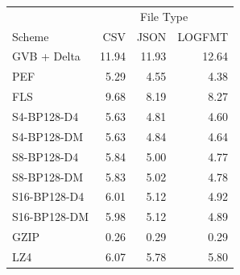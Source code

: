 \begin{tabular}{lrrr}
\toprule
 & \multicolumn{3}{c}{File Type} \\
Scheme & CSV & JSON & LOGFMT \\
\midrule
GVB + Delta & 11.94 & 11.93 & 12.64 \\
PEF & 5.29 & 4.55 & 4.38 \\
FLS & 9.68 & 8.19 & 8.27 \\
S4-BP128-D4 & 5.63 & 4.81 & 4.60 \\
S4-BP128-DM & 5.63 & 4.84 & 4.64 \\
S8-BP128-D4 & 5.84 & 5.00 & 4.77 \\
S8-BP128-DM & 5.83 & 5.02 & 4.78 \\
S16-BP128-D4 & 6.01 & 5.12 & 4.92 \\
S16-BP128-DM & 5.98 & 5.12 & 4.89 \\
GZIP & 0.26 & 0.29 & 0.29 \\
LZ4 & 6.07 & 5.78 & 5.80 \\
\bottomrule
\end{tabular}
